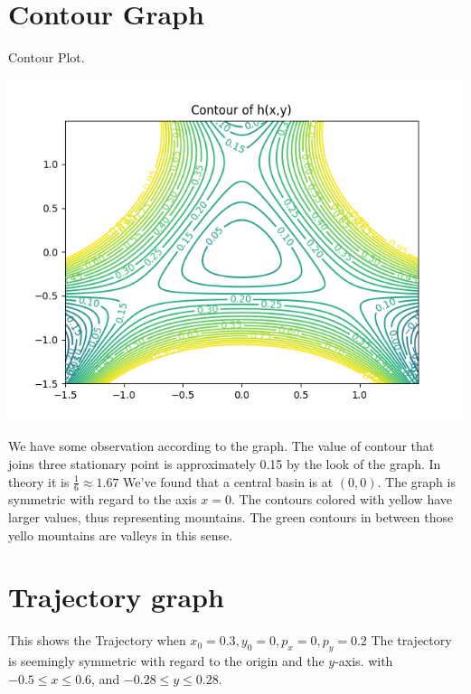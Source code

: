\documentclass{article}
\begin{document}
\pagebreak

\section{Contour Graph}
Contour Plot.

\includegraphics[scale=0.5]{./Contour.png}

We have some observation according to the graph.
The value of contour that joins three stationary point is approximately 0.15 by the look of the graph. In theory it is $\frac{1}{6}\approx 1.67$
We've found that a central basin is at $(0, 0)$.
The graph is symmetric with regard to the axis $x = 0$.
The contours colored with yellow have larger values, thus representing mountains.
The green contours in between those yello mountains are valleys in this sense.

\section{Trajectory graph}
	This shows the Trajectory when $x_0 = 0.3, y_0 = 0, p_x = 0, p_y = 0.2$
	The trajectory is seemingly symmetric with
	regard to the origin and the $y$-axis. with $-0.5\le x \le 0.6$, and $-0.28 \le y \le 0.28$.
\end{document}
